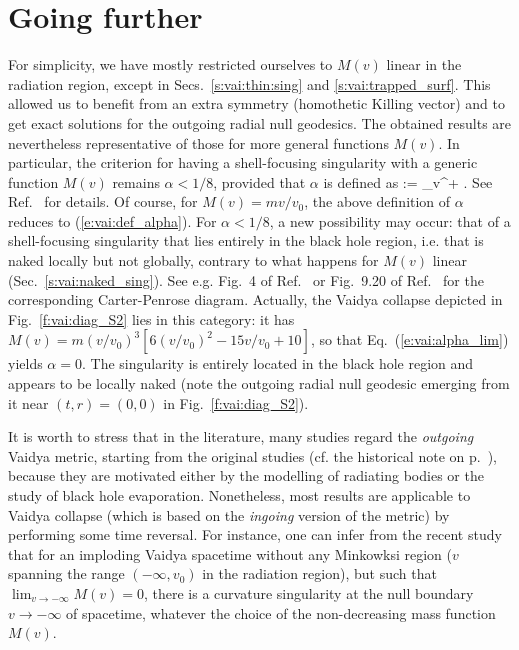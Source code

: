 

\section{Going further}

For simplicity, we have mostly restricted ourselves to $M(v)$ linear in the radiation
region, except in Secs.~\ref{s:vai:thin:sing} and \ref{s:vai:trapped_surf}.
This allowed us to benefit from an extra symmetry (homothetic Killing vector) and to get
exact solutions for the outgoing radial null geodesics.
The obtained results are nevertheless representative of those for more
general functions
$M(v)$. In particular, the criterion for having a shell-focusing singularity
with a generic function $M(v)$ remains $\alpha < 1/8$, provided that $\alpha$ is defined
as
\be \label{e:vai:alpha_lim}
    \alpha := \lim_{v^+}  .
\ee
See Ref.~\cite{Kurod84,FayosT08} for details. Of course, for $M(v) = m v /v_0$, the
above definition of $\alpha$ reduces to (\ref{e:vai:def_alpha}).
For $\alpha < 1/8$, a new possibility may occur: that of a shell-focusing singularity
that lies entirely in the black hole region, i.e. that is naked locally but not globally,
contrary to what happens for $M(v)$ linear (Sec.~\ref{s:vai:naked_sing}).
See e.g. Fig.~4 of Ref.~\cite{AshteK04} or Fig.~9.20 of Ref.~\cite{GriffP09}
for the corresponding Carter-Penrose diagram.
Actually, the Vaidya collapse depicted in Fig.~\ref{f:vai:diag_S2} lies in this
category: it has $M(v) = m (v/v_0)^3 \left[ 6 (v/v_0)^2 - 15 v/v_0 + 10 \right]$,
so that Eq.~(\ref{e:vai:alpha_lim}) yields $\alpha = 0$.
The singularity is entirely located in the black
hole region and appears to be locally naked (note the outgoing radial null geodesic
emerging from it near $(t,r) = (0,0)$ in Fig.~\ref{f:vai:diag_S2}).

It is worth to stress that in the literature,
many studies regard the \emph{outgoing} Vaidya metric, starting from the original studies
(cf. the historical note on p.~\pageref{h:vai:origin}), because they are
motivated either by the modelling of radiating bodies or the
study of black hole evaporation. Nonetheless, most results are applicable
to Vaidya collapse (which is based on the
\emph{ingoing} version of the metric) by performing some time reversal.
For instance, one can infer from the recent study \cite{CoudrN21}
that for an imploding Vaidya spacetime without any Minkowksi region
($v$ spanning the range $(-\infty, v_0)$ in the radiation region),
but such that $\lim_{v\to -\infty} M(v) = 0$, there is a curvature singularity
at the null boundary $v\to -\infty$ of spacetime, whatever the choice of the
non-decreasing mass function $M(v)$.



